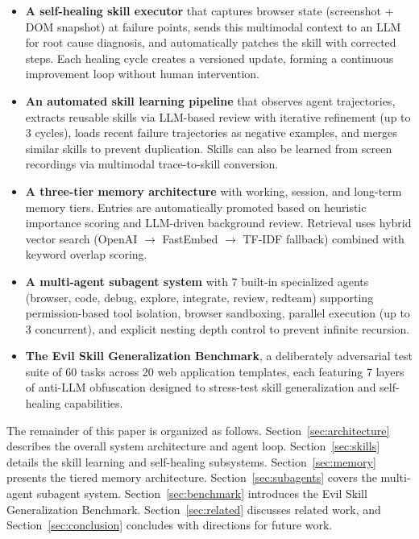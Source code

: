 \begin{itemize}[leftmargin=*,itemsep=2pt]
    \item \textbf{A self-healing skill executor} that captures browser state (screenshot + DOM snapshot) at failure points, sends this multimodal context to an LLM for root cause diagnosis, and automatically patches the skill with corrected steps. Each healing cycle creates a versioned update, forming a continuous improvement loop without human intervention.
    \item \textbf{An automated skill learning pipeline} that observes agent trajectories, extracts reusable skills via LLM-based review with iterative refinement (up to 3 cycles), loads recent failure trajectories as negative examples, and merges similar skills to prevent duplication. Skills can also be learned from screen recordings via multimodal trace-to-skill conversion.
    \item \textbf{A three-tier memory architecture} with working, session, and long-term memory tiers. Entries are automatically promoted based on heuristic importance scoring and LLM-driven background review. Retrieval uses hybrid vector search (OpenAI $\rightarrow$ FastEmbed $\rightarrow$ TF-IDF fallback) combined with keyword overlap scoring.
    \item \textbf{A multi-agent subagent system} with 7 built-in specialized agents (browser, code, debug, explore, integrate, review, redteam) supporting permission-based tool isolation, browser sandboxing, parallel execution (up to 3 concurrent), and explicit nesting depth control to prevent infinite recursion.
    \item \textbf{The Evil Skill Generalization Benchmark}, a deliberately adversarial test suite of 60 tasks across 20 web application templates, each featuring 7 layers of anti-LLM obfuscation designed to stress-test skill generalization and self-healing capabilities.
\end{itemize}

The remainder of this paper is organized as follows. Section~\ref{sec:architecture} describes the overall system architecture and agent loop. Section~\ref{sec:skills} details the skill learning and self-healing subsystems. Section~\ref{sec:memory} presents the tiered memory architecture. Section~\ref{sec:subagents} covers the multi-agent subagent system. Section~\ref{sec:benchmark} introduces the Evil Skill Generalization Benchmark. Section~\ref{sec:related} discusses related work, and Section~\ref{sec:conclusion} concludes with directions for future work.
